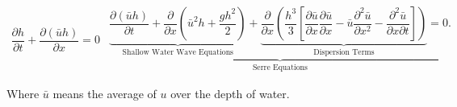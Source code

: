 \documentclass[SingleSpace,12pt]{Serre_ASCE}
\begin{document}
\begin{linenomath*}
\begin{subequations}\label{eq:Serre_conservative_form}
\begin{gather}
\dfrac{\partial h}{\partial t} + \dfrac{\partial (\bar{u}h)}{\partial x} = 0
\label{eq:Serre_continuity}
\end{gather}
\begin{gather}
\underbrace{\underbrace{\dfrac{\partial (\bar{u}h)}{\partial t} + \dfrac{\partial}{\partial x} \left ( \bar{u}^2h + \dfrac{gh^2}{2}\right )}_{\text{Shallow Water Wave Equations}} + \underbrace{\dfrac{\partial}{\partial x} \left (  \dfrac{h^3}{3} \left [ \dfrac{\partial \bar{u} }{\partial x} \dfrac{\partial \bar{u}}{\partial x} - \bar{u} \dfrac{\partial^2 \bar{u}}{\partial x^2}  - \dfrac{\partial^2 \bar{u}}{\partial x \partial t}\right ] \right )}_{\text{Dispersion Terms}} = 0.}_{\text{Serre Equations}}
\label{eq:Serre_momentum}
\end{gather}
\end{subequations}
\end{linenomath*}
Where $\bar{u}$ means the average of $u$ over the depth of water.
\end{document}
